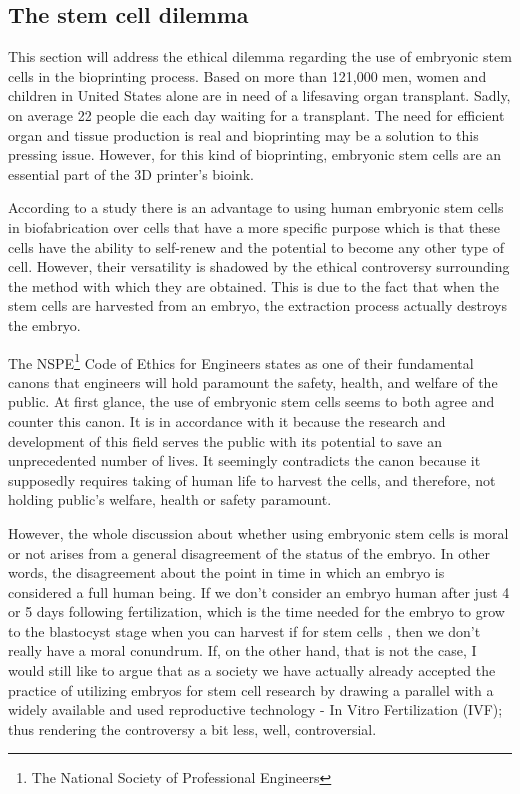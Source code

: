 \documentclass[12pt]{article} %
\begin{document}
\subsection{The stem cell dilemma} %

This section will address the ethical dilemma regarding the use of embryonic stem cells in the bioprinting process. 
Based on \cite{OPTN data as of January 2016} more than 121,000 men, women and children in United States alone are in need of a lifesaving organ transplant. Sadly, on average 22 people die each day waiting for a transplant. The need for efficient organ and tissue production is real and bioprinting may be a solution to this pressing issue. However, for this kind of bioprinting, embryonic stem cells are an essential part of the 3D printer's bioink.

According to a study \cite{Faulkner-Jones:2013} there is an advantage to using human embryonic stem cells in biofabrication over cells that have a more specific purpose which is that these cells have the ability to self-renew and the potential to become any other type of cell. However, their versatility is shadowed by the ethical controversy surrounding the method with which they are obtained. This is due to the fact that when the stem cells are harvested from an embryo, the extraction process actually destroys the embryo. 

The NSPE\footnote{The National Society of Professional Engineers} Code of Ethics for Engineers states as one of their fundamental canons that engineers will hold paramount the safety, health, and welfare of the public. At first glance, the use of embryonic stem cells seems to both agree and counter this canon. 
It is in accordance with it because the research and development of this field serves the public with its potential to save an unprecedented number of lives. 
It seemingly contradicts the canon because it supposedly requires taking of human life to harvest the cells, and therefore, not holding public's welfare, health or safety paramount. 

However, the whole discussion about whether using embryonic stem cells is moral or not arises from a general disagreement of the status of the embryo. In other words, the disagreement about the point in time in which an embryo is considered a full human being. If we don't consider an embryo human after just 4 or 5 days following fertilization, which is the time needed for the embryo to grow to the blastocyst stage when you can harvest if for stem cells \cite{Landry:2016}, then we don't really have a moral conundrum. If, on the other hand, that is not the case, I would still like to argue that as a society we have actually already accepted the practice of utilizing embryos for stem cell research by drawing a parallel with a widely available and used reproductive technology - In Vitro Fertilization (IVF); thus rendering the controversy a bit less, well, controversial. 
\end{document}
